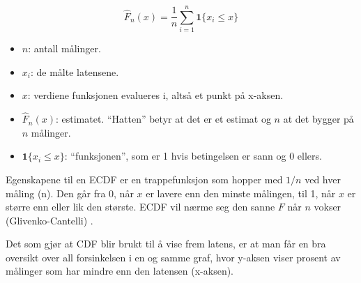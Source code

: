 \documentclass[norsk]{uiobachelorthesis}
\begin{document}
\begin{equation}
  \hat{F}_n(x) = \frac{1}{n} \sum_{i=1}^{n} \mathbf{1}\{x_i \le x\}
  \label{eq:ecdf}
\end{equation}
\begin{itemize}

\item[-] $n$: antall målinger.
\item[-] $x_i$: de målte latensene.
\item[-] $x$: verdiene funksjonen evalueres i, altså et punkt på x-aksen.
\item[-] $\hat{F}_n(x)$: estimatet. \enquote{Hatten} betyr at det er et estimat og $n$ at det bygger på $n$ målinger.
\item[-]$\mathbf{1}\{x_i \le x\}$: \enquote{funksjonen}, som er 1 hvis betingelsen er sann og 0 ellers.
\end{itemize}

Egenskapene til en ECDF er en trappefunksjon som hopper med $1/n$ ved hver måling (n).
Den går fra 0, når $x$ er lavere enn den minste målingen, til 1, når $x$ er større enn eller lik den største.
ECDF vil nærme seg den sanne $F$ når $n$ vokser (Glivenko-Cantelli) \parencite{wasserman2006}. 

Det som gjør at CDF blir brukt til å vise frem latens, er at man får en bra oversikt over all forsinkelsen i en og samme graf, hvor y-aksen viser prosent av målinger som har mindre enn den latensen (x-aksen).%
	
\end{document}
